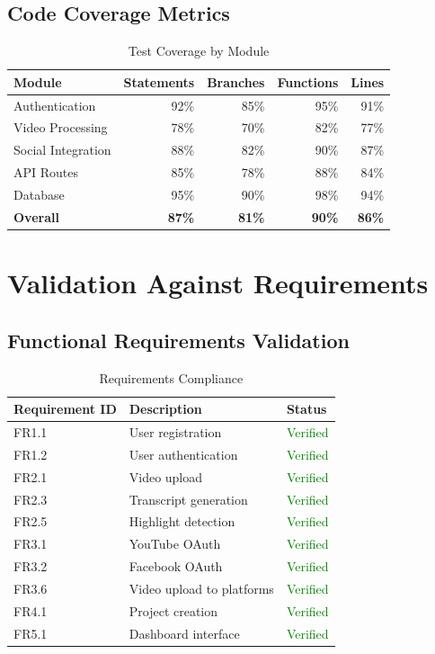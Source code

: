 \subsection{Code Coverage Metrics}

\begin{table}[H]
\centering
\caption{Test Coverage by Module}
\begin{tabular}{@{}lrrrr@{}}
\toprule
\textbf{Module} & \textbf{Statements} & \textbf{Branches} & \textbf{Functions} & \textbf{Lines} \\
\midrule
Authentication & 92\% & 85\% & 95\% & 91\% \\
Video Processing & 78\% & 70\% & 82\% & 77\% \\
Social Integration & 88\% & 82\% & 90\% & 87\% \\
API Routes & 85\% & 78\% & 88\% & 84\% \\
Database & 95\% & 90\% & 98\% & 94\% \\
\midrule
\textbf{Overall} & \textbf{87\%} & \textbf{81\%} & \textbf{90\%} & \textbf{86\%} \\
\bottomrule
\end{tabular}
\end{table}

\section{Validation Against Requirements}

\subsection{Functional Requirements Validation}

\begin{table}[H]
\centering
\caption{Requirements Compliance}
\begin{tabular}{@{}lll@{}}
\toprule
\textbf{Requirement ID} & \textbf{Description} & \textbf{Status} \\
\midrule
FR1.1 & User registration & \textcolor{green}{Verified} \\
FR1.2 & User authentication & \textcolor{green}{Verified} \\
FR2.1 & Video upload & \textcolor{green}{Verified} \\
FR2.3 & Transcript generation & \textcolor{green}{Verified} \\
FR2.5 & Highlight detection & \textcolor{green}{Verified} \\
FR3.1 & YouTube OAuth & \textcolor{green}{Verified} \\
FR3.2 & Facebook OAuth & \textcolor{green}{Verified} \\
FR3.6 & Video upload to platforms & \textcolor{green}{Verified} \\
FR4.1 & Project creation & \textcolor{green}{Verified} \\
FR5.1 & Dashboard interface & \textcolor{green}{Verified} \\
\bottomrule
\end{tabular}
\end{table}


